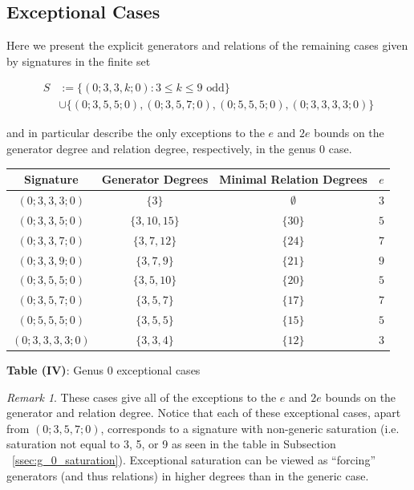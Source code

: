 \documentclass{amsart}
\theoremstyle{plain}
\theoremstyle{definition}
\theoremstyle{remark}
\newtheorem{rem}[thm]{Remark}
\numberwithin{equation}{section}
\newcommand\ssec{\subsection}
\begin{document}
\ssec{Exceptional Cases}
\label{ssec:g_0_exceptional}
Here we present the explicit generators and relations of the remaining
cases given by signatures in the finite set

\begin{align*}
	S &:= \{(0; 3, 3, k; 0) : 3 \leq k \leq 9 \text{ odd}\} \\
		&\cup \{(0; 3, 5, 5; 0) ,(0; 3, 5, 7; 0), (0; 5, 5, 5; 0), (0; 3, 3, 3, 3; 0)\}
\end{align*}

\noindent
and in particular describe the only exceptions to the $e$ and $2e$
bounds on the generator degree and relation degree, respectively,
in the genus 0 case.

\begin{longtable}
	{| c || c | c | c |}
	\hline
	Signature & Generator Degrees & Minimal Relation Degrees & $e$ \\
	\hline
	\hline

	$(0; 3, 3, 3; 0)$ & $\{3\}$ & $\emptyset$ & $3$ \\	\hline

	$(0; 3, 3, 5; 0)$ & $\{3, 10, 15\}$ & $\{30\}$ & $5$ \\	\hline
	
	$(0; 3, 3, 7; 0)$ & $\{3, 7, 12\}$ & $\{24\}$ & $7$ \\	\hline
	
	$(0; 3, 3, 9; 0)$ & $\{3, 7, 9\}$ & $\{21\}$ & $9$ \\	\hline
	
	$(0; 3, 5, 5; 0)$ & $\{3, 5, 10\}$ & $\{20\}$ & $5$ \\	\hline
	
	$(0; 3, 5, 7; 0)$ & $\{3, 5, 7\}$ & $\{17\}$ & $7$ \\	\hline
	
	$(0; 5, 5, 5; 0)$ & $\{3, 5, 5\}$ & $\{15\}$ & $5$ \\	\hline
	
	$(0; 3, 3, 3, 3; 0)$ & $\{3, 3, 4\}$ & $\{12\}$ & $3$ \\	\hline
\end{longtable}

\begin{center}
\textbf{Table (IV)}: Genus 0 exceptional cases
\end{center}

\begin{rem}
These cases give all of the exceptions to the $e$ and $2e$ bounds on
the generator and relation degree. Notice that each of these
exceptional cases, apart from $(0; 3, 5, 7; 0)$, corresponds to a
signature with non-generic saturation (i.e. saturation not equal to
3, 5, or 9 as seen in the table in Subsection
~\ref{ssec:g_0_saturation}). Exceptional saturation can be viewed as
``forcing'' generators (and thus relations) in higher degrees than
in the generic case.
\end{rem}
\end{document}
